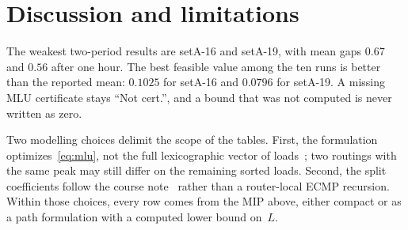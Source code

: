 \section{Discussion and limitations}

The weakest two-period results are setA-16 and setA-19, with mean gaps $0.67$ and $0.56$
after one hour.
The best feasible value among the ten runs is better than the reported mean: $0.1025$ for
setA-16 and $0.0796$ for setA-19.
A missing MLU certificate stays ``Not cert.'', and a bound that was not computed is never
written as zero.

Two modelling choices delimit the scope of the tables.
First, the formulation optimizes~\eqref{eq:mlu}, not the full lexicographic vector of
loads~\citep{orange2026}; two routings with the same peak may still differ on the remaining
sorted loads.
Second, the split coefficients follow the course note~\citep{courser2026} rather than a
router-local ECMP recursion.
Within those choices, every row comes from the MIP above, either compact or as a path
formulation with a computed lower bound on~$L$.
